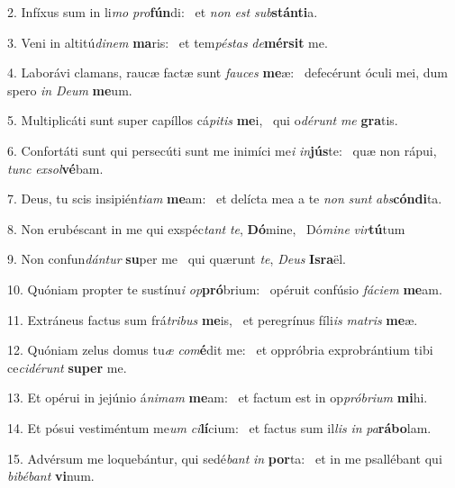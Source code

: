 2. Infíxus sum in li\textit{mo} \textit{pro}\textbf{fún}di: \ast\  et \textit{non} \textit{est} \textit{sub}\textbf{stán}\textbf{ti}a.\

3. Veni in altitú\textit{di}\textit{nem} \textbf{ma}ris: \ast\  et tem\textit{pés}\textit{tas} \textit{de}\textbf{mér}\textbf{sit} me.\

4. Laborávi clamans, raucæ factæ sunt \textit{fau}\textit{ces} \textbf{me}æ: \ast\  defecérunt óculi mei, dum spero \textit{in} \textit{De}\textit{um} \textbf{me}um.\

5. Multiplicáti sunt super capíllos cá\textit{pi}\textit{tis} \textbf{me}i, \ast\  qui o\textit{dé}\textit{runt} \textit{me} \textbf{gra}tis.\

6. Confortáti sunt qui persecúti sunt me inimíci me\textit{i} \textit{in}\textbf{jús}te: \ast\  quæ non rápui, \textit{tunc} \textit{ex}\textit{sol}\textbf{vé}bam.\

7. Deus, tu scis insipién\textit{ti}\textit{am} \textbf{me}am: \ast\  et delícta mea a te \textit{non} \textit{sunt} \textit{abs}\textbf{cón}\textbf{di}ta.\

8. Non erubéscant in me qui exspéc\textit{tant} \textit{te}, \textbf{Dó}mine, \ast\  Dó\textit{mi}\textit{ne} \textit{vir}\textbf{tú}tum\

9. Non confun\textit{dán}\textit{tur} \textbf{su}per me \ast\  qui quærunt \textit{te}, \textit{De}\textit{us} \textbf{Is}\textbf{ra}ël.\

10. Quóniam propter te sustínu\textit{i} \textit{op}\textbf{pró}brium: \ast\  opéruit confúsio \textit{fá}\textit{ci}\textit{em} \textbf{me}am.\

11. Extráneus factus sum frá\textit{tri}\textit{bus} \textbf{me}is, \ast\  et peregrínus fíli\textit{is} \textit{ma}\textit{tris} \textbf{me}æ.\

12. Quóniam zelus domus tu\textit{æ} \textit{com}\textbf{é}dit me: \ast\  et oppróbria exprobrántium tibi ce\textit{ci}\textit{dé}\textit{runt} \textbf{su}\textbf{per} me.\

13. Et opérui in jejúnio á\textit{ni}\textit{mam} \textbf{me}am: \ast\  et factum est in op\textit{pró}\textit{bri}\textit{um} \textbf{mi}hi.\

14. Et pósui vestiméntum me\textit{um} \textit{ci}\textbf{lí}cium: \ast\  et factus sum il\textit{lis} \textit{in} \textit{pa}\textbf{rá}\textbf{bo}lam.\

15. Advérsum me loquebántur, qui sedé\textit{bant} \textit{in} \textbf{por}ta: \ast\  et in me psallébant qui \textit{bi}\textit{bé}\textit{bant} \textbf{vi}num.\

